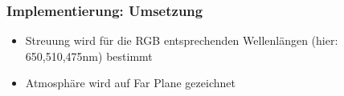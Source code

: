 \documentclass[german]{beamer}
\begin{document}
\begin{frame}
\frametitle{Implementierung: Umsetzung}

\begin{itemize}
	\item Streuung wird für die RGB entsprechenden Wellenlängen (hier: 650,510,475nm) bestimmt
	\item Atmosphäre wird auf Far Plane gezeichnet
\end{itemize}

\end{frame}
\end{document}
